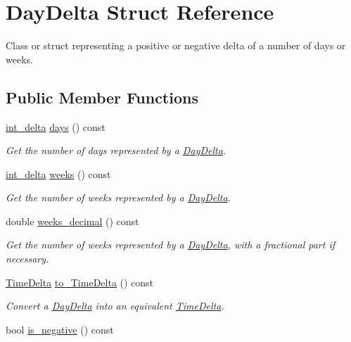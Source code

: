 \hypertarget{structDayDelta}{\section{Day\-Delta Struct Reference}
\label{structDayDelta}
}


Class or struct representing a positive or negative delta of a number of days or weeks.  


\subsection*{Public Member Functions}
\begin{DoxyCompactItemize}
\item 
\hyperlink{types_8h_a8a67cf99971c5cfeeaa2380ba84a4c92}{int\-\_\-delta} \hyperlink{structDayDelta_af7d15328d1c97bbd3316f014c69a6e3b}{days} () const 
\begin{DoxyCompactList}\small\item\em Get the number of days represented by a \hyperlink{structDayDelta}{Day\-Delta}. \end{DoxyCompactList}\item 
\hyperlink{types_8h_a8a67cf99971c5cfeeaa2380ba84a4c92}{int\-\_\-delta} \hyperlink{structDayDelta_a48287489831fa9ec472451487908e663}{weeks} () const 
\begin{DoxyCompactList}\small\item\em Get the number of weeks represented by a \hyperlink{structDayDelta}{Day\-Delta}. \end{DoxyCompactList}\item 
double \hyperlink{structDayDelta_adf33ed4a012b6326d2d172d1f7420ab1}{weeks\-\_\-decimal} () const 
\begin{DoxyCompactList}\small\item\em Get the number of weeks represented by a \hyperlink{structDayDelta}{Day\-Delta}, with a fractional part if necessary. \end{DoxyCompactList}\item 
\hyperlink{structTimeDelta}{Time\-Delta} \hyperlink{structDayDelta_a4e95505d0c45e5cc01d74259df3e4868}{to\-\_\-\-Time\-Delta} () const 
\begin{DoxyCompactList}\small\item\em Convert a \hyperlink{structDayDelta}{Day\-Delta} into an equivalent \hyperlink{structTimeDelta}{Time\-Delta}. \end{DoxyCompactList}\item 
bool \hyperlink{structDayDelta_a10d6b9eac43322a957f7c3dfbedc2862}{is\-\_\-negative} () const 

\end{DoxyCompactItemize}

